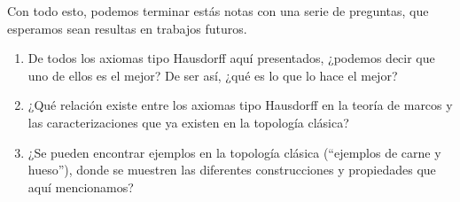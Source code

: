 \documentclass{comunicaciones}
\begin{document}
Con todo esto, podemos terminar estás notas con una serie de preguntas, que esperamos sean resultas en trabajos futuros.
\begin{enumerate}
    \item De todos los axiomas tipo Hausdorff aquí presentados, ¿podemos decir que uno de ellos es el mejor? De ser así, ¿qué es lo que lo hace el mejor?
    \item ¿Qué relación existe entre los axiomas tipo Hausdorff en la teoría de marcos y las caracterizaciones que ya existen en la topología clásica?
    \item ¿Se pueden encontrar ejemplos en la topología clásica (``ejemplos de carne y hueso''), donde se muestren las diferentes construcciones y propiedades que aquí mencionamos?
\end{enumerate}
\end{document}
